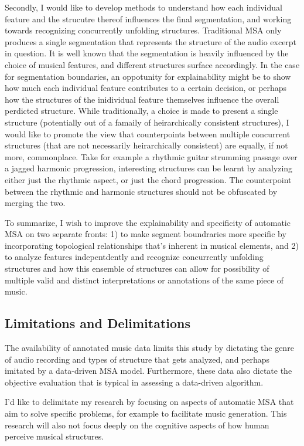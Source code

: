 Secondly, I would like to develop methods to understand how each individual feature and the strucutre thereof influences the final segmentation, and working towards recognizing concurrently unfolding structures. 
Traditional MSA only produces a single segmentation that represents the structure of the audio excerpt in question. 
It is well known that the segmentation is heavily influenced by the choice of musical features, and different structures surface accordingly. 
In the case for segmentation boundaries, an oppotunity for explainability might be to show how much each individual feature contributes to a certain decision, or perhaps how the structures of the inidividual feature themselves influence the overall perdicted structure.
While traditionally, a choice is made to present a single structure (potentially out of a famaily of heirarchically consistent structures), I would like to promote the view that counterpoints between multiple concurrent structures (that are not necessarily heirarchically consistent) are equally, if not more, commonplace. 
Take for example a rhythmic guitar strumming passage over a jagged harmonic progression, interesting structures can be learnt by analyzing either just the rhythmic aspect, or just the chord progression. 
The counterpoint between the rhythmic and harmonic structures should not be obfuscated by merging the two.

To summarize, I wish to improve the explainability and specificity of automatic MSA on two separate fronts: 1) to make segment boundraries more specific by incorporating topological relationships that’s inherent in musical elements, and 2) to analyze features indepentdently and recognize concurrently unfolding structures and how this ensemble of structures can allow for possibility of multiple valid and distinct interpretations or annotations of the same piece of music.

\subsection{Limitations and Delimitations}
The availability of annotated music data limits this study by dictating the genre of audio recording and types of structure that gets analyzed, and perhaps imitated by a data-driven MSA model. 
Furthermore, these data also dictate the objective evaluation that is typical in assessing a data-driven algorithm.

I’d like to delimitate my research by focusing on aspects of automatic MSA that aim to solve specific problems, for example to facilitate music generation. 
This research will also not focus deeply on the cognitive aspects of how human perceive musical structures.

